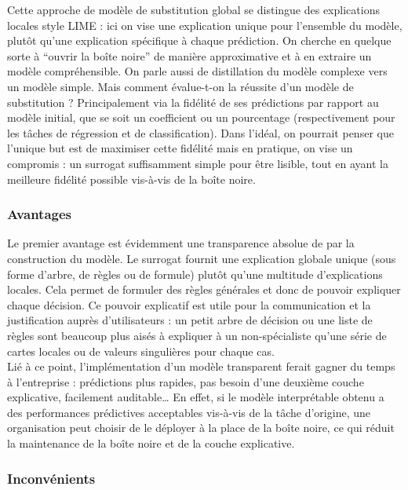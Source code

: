 \documentclass{article}
\begin{document}
Cette approche de modèle de substitution global se distingue des explications locales style LIME : ici on vise une explication unique pour l’ensemble du modèle, plutôt qu’une explication spécifique à chaque prédiction. On cherche en quelque sorte à “ouvrir la boîte noire” de manière approximative et à en extraire un modèle compréhensible. On parle aussi de distillation du modèle complexe vers un modèle simple. Mais comment évalue-t-on la réussite d’un modèle de substitution ? Principalement via la fidélité de ses prédictions par rapport au modèle initial, que se soit un coefficient ou un pourcentage (respectivement pour les tâches de régression et de classification). Dans l'idéal, on pourrait penser que l’unique but est de maximiser cette fidélité mais en pratique, on vise un compromis : un surrogat suffisamment simple pour être lisible, tout en ayant la meilleure fidélité possible vis-à-vis de la boîte noire.

    \subsubsection{Avantages}

    \quad Le premier avantage est évidemment une transparence absolue de par la construction du modèle. Le surrogat fournit une explication globale unique (sous forme d’arbre, de règles ou de formule) plutôt qu’une multitude d’explications locales. Cela permet de formuler des règles générales et donc de pouvoir expliquer chaque décision. Ce pouvoir explicatif est utile pour la communication et la justification auprès d’utilisateurs : un petit arbre de décision ou une liste de règles sont beaucoup plus aisés à expliquer à un non-spécialiste qu’une série de cartes locales ou de valeurs singulières pour chaque cas.\\
    
    Lié à ce point, l'implémentation d’un modèle transparent ferait gagner du temps à l'entreprise : prédictions plus rapides, pas besoin d’une deuxième couche explicative, facilement auditable… En effet, si le modèle interprétable obtenu a des performances prédictives acceptables vis-à-vis de la tâche d’origine, une organisation peut choisir de le déployer à la place de la boîte noire, ce qui réduit la maintenance de la boîte noire et de la couche explicative.

    \subsubsection{Inconvénients}
\end{document}
